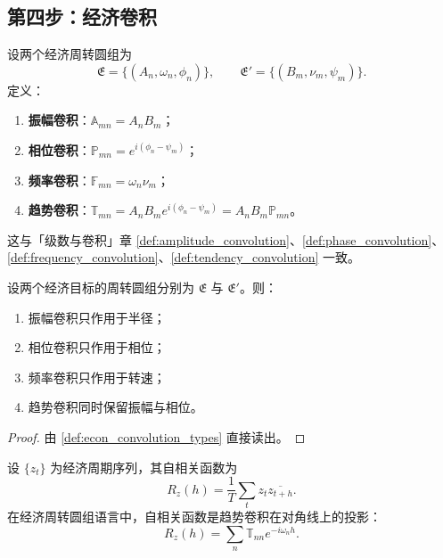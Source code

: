 \subsection{第四步：经济卷积}

\begin{definition}\label{def:econ_convolution_types}
设两个经济周转圆组为
\[
\mathfrak E=\{(A_n,\omega_n,\phi_n)\},\qquad
\mathfrak E'=\{(B_m,\nu_m,\psi_m)\}.
\]
定义：
\begin{enumerate}[label=(\roman*)]
    \item \textbf{振幅卷积}：$\mathbb A_{mn}=A_nB_m$；
    \item \textbf{相位卷积}：$\mathbb P_{mn}=e^{i(\phi_n-\psi_m)}$；
    \item \textbf{频率卷积}：$\mathbb F_{mn}=\omega_n\nu_m$；
    \item \textbf{趋势卷积}：$\mathbb T_{mn}=A_nB_m e^{i(\phi_n-\psi_m)}=A_nB_m\mathbb P_{mn}$。
\end{enumerate}
这与「级数与卷积」章 \cref{def:amplitude_convolution}、\cref{def:phase_convolution}、\cref{def:frequency_convolution}、\cref{def:tendency_convolution} 一致。
\end{definition}

\begin{theorem}[三类卷积在经济周转圆组上的作用]\label{thm:econ_convolution_action}
设两个经济目标的周转圆组分别为 $\mathfrak E$ 与 $\mathfrak E'$。则：
\begin{enumerate}[label=(\roman*)]
    \item 振幅卷积只作用于半径；
    \item 相位卷积只作用于相位；
    \item 频率卷积只作用于转速；
    \item 趋势卷积同时保留振幅与相位。
\end{enumerate}
\end{theorem}

\begin{proof}
由 \cref{def:econ_convolution_types} 直接读出。
\end{proof}

\begin{proposition}[自相关与趋势卷积]\label{prop:econ_autocorr_phase_convolution}
设 $\{z_t\}$ 为经济周期序列，其自相关函数为
\[
R_z(h)=\frac1T\sum_t z_t\overline{z_{t+h}}.
\]
在经济周转圆组语言中，自相关函数是趋势卷积在对角线上的投影：
\[
R_z(h)=\sum_n\mathbb T_{nn}e^{-i\omega_n h}.
\]
\end{proposition}

